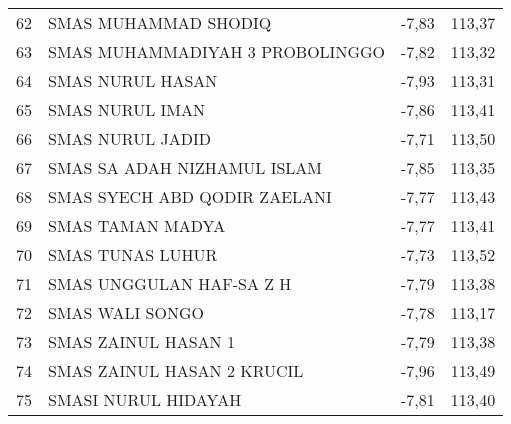 {\begin{longtable}[c]{clcc}
62 & SMAS   MUHAMMAD SHODIQ                & -7,83 & 113,37 \\
\rowcolor[HTML]{D9E1F2} 
63 & SMAS MUHAMMADIYAH 3 PROBOLINGGO       & -7,82 & 113,32 \\
64 & SMAS   NURUL HASAN                    & -7,93 & 113,31 \\
\rowcolor[HTML]{D9E1F2} 
65 & SMAS NURUL IMAN                       & -7,86 & 113,41 \\
66 & SMAS   NURUL JADID                    & -7,71 & 113,50 \\
\rowcolor[HTML]{D9E1F2} 
67 & SMAS SA ADAH NIZHAMUL ISLAM           & -7,85 & 113,35 \\
68 & SMAS   SYECH ABD QODIR ZAELANI        & -7,77 & 113,43 \\
\rowcolor[HTML]{D9E1F2} 
69 & SMAS TAMAN MADYA                      & -7,77 & 113,41 \\
70 & SMAS   TUNAS LUHUR                    & -7,73 & 113,52 \\
\rowcolor[HTML]{D9E1F2} 
71 & SMAS UNGGULAN HAF-SA Z H              & -7,79 & 113,38 \\
72 & SMAS   WALI SONGO                     & -7,78 & 113,17 \\
\rowcolor[HTML]{D9E1F2} 
73 & SMAS ZAINUL HASAN 1                   & -7,79 & 113,38 \\
74 & SMAS   ZAINUL HASAN 2 KRUCIL          & -7,96 & 113,49 \\
\rowcolor[HTML]{D9E1F2} 
75 & SMASI NURUL HIDAYAH                   & -7,81 & 113,40 \\ \cline{2-4} 
\end{longtable}
}